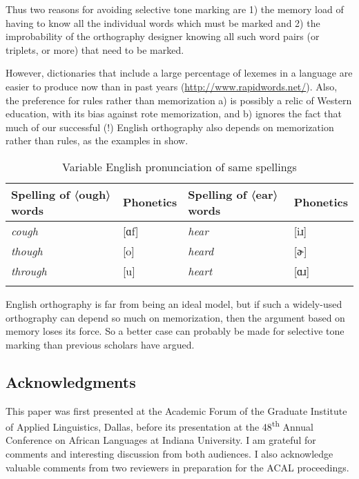 \documentclass[output=paper]{langscibook}
\begin{document}
Thus two reasons for avoiding selective tone marking are 1) the memory load of having to know all the individual words which must be marked and 2) the improbability of the orthography designer knowing all such word pairs (or triplets, or more) that need to be marked.

However, dictionaries that include a large percentage of lexemes in a language are easier to produce now than in past years (\url{http://www.rapidwords.net/}). Also, the preference for rules rather than memorization a) is possibly a relic of Western education, with its bias against rote memorization, and b) ignores the fact that much of our successful (!) English orthography also depends on memorization rather than rules, as the examples in  show.

\begin{table}
    \begin{tabular}{llll}
        \lsptoprule
        Spelling of 〈ough〉 words & Phonetics &  Spelling of 〈ear〉 words & Phonetics\\
        \midrule
        \textit{cough} & [ɑf] &  \textit{hear} & [iɹ]\\
        \textit{though} & [o] &  \textit{heard} & [ɚ]\\
        \textit{through} & [u] &  \textit{heart} & [ɑɹ]\\
        \lspbottomrule
    \end{tabular}
    \caption{Variable English pronunciation of same spellings}
    \label{tab:VariableEnglishPronunciation}
\end{table}

English orthography is far from being an ideal model, but if such a widely-used orthography can depend so much on memorization, then the argument based on memory loses its force. So a better case can probably be made for selective tone marking than previous scholars have argued.

\subsection{ Acknowledgments}

This paper was first presented at the Academic Forum of the Graduate Institute of Applied Linguistics, Dallas, before its presentation at the 48\textsuperscript{th} Annual Conference on African Languages at Indiana University. I am grateful for comments and interesting discussion from both audiences. I also acknowledge valuable comments from two reviewers in preparation for the ACAL proceedings.


{\sloppy
\printbibliography[heading=subbibliography,notkeyword=this] 
}
\end{document}
